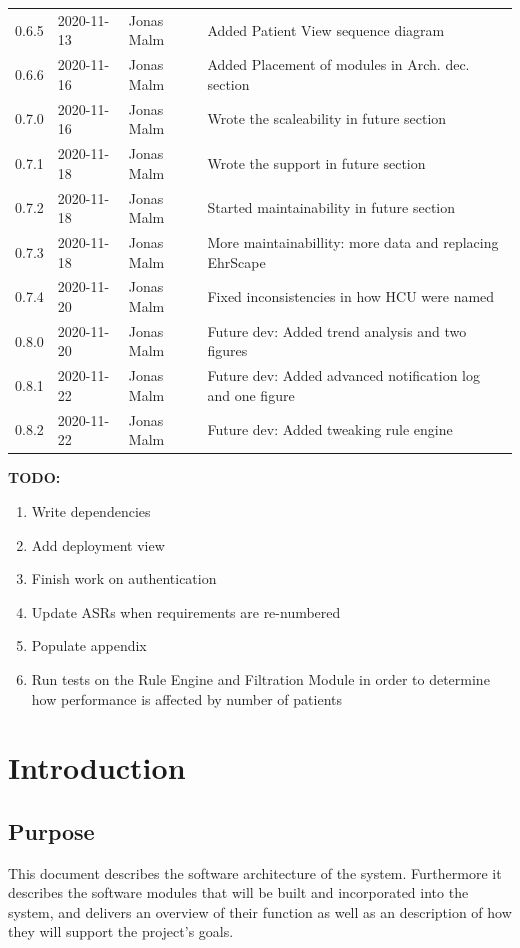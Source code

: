 \documentclass{article}
\begin{document}
\begin{table}
\begin{tabular}{|l|l|l|l|}
0.6.5 & 2020-11-13 & Jonas Malm & Added Patient View sequence diagram\\
0.6.6 & 2020-11-16 & Jonas Malm & Added Placement of modules in Arch. dec. section\\
0.7.0 & 2020-11-16 & Jonas Malm & Wrote the scaleability in future section\\
0.7.1 & 2020-11-18 & Jonas Malm & Wrote the support in future section\\
0.7.2 & 2020-11-18 & Jonas Malm & Started maintainability in future section\\
0.7.3 & 2020-11-18 & Jonas Malm & More maintainabillity: more data and replacing EhrScape\\
0.7.4 & 2020-11-20 & Jonas Malm & Fixed inconsistencies in how HCU were named\\
0.8.0 & 2020-11-20 & Jonas Malm & Future dev: Added trend analysis and two figures\\
0.8.1 & 2020-11-22 & Jonas Malm & Future dev: Added advanced notification log and one figure\\
0.8.2 & 2020-11-22 & Jonas Malm & Future dev: Added tweaking rule engine\\


\hline
\end{tabular}
\end{table}
\restoregeometry

\textbf{TODO:}
\begin{enumerate}[label=(\roman*)]
\item Write dependencies
\item Add deployment view
\item Finish work on authentication
\item Update ASRs when requirements are re-numbered
\item Populate appendix
\item Run tests on the Rule Engine and Filtration Module in order to determine how performance is affected by number of patients
\end{enumerate}


\clearpage

\tableofcontents
\clearpage

\section{Introduction}
\subsection{Purpose}
This document describes the software architecture of the system. Furthermore it describes the software modules that will be built and incorporated into the system, and delivers an overview of their function as well as an description of how they will support the project's goals.
\end{document}
